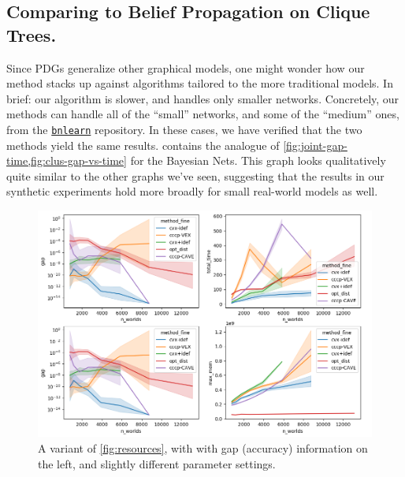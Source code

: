 \subsection{Comparing to Belief Propagation on Clique Trees.}
    \label{sec:bn-expt-details}
 Since PDGs generalize other graphical models, one might wonder how
 our method stacks up against algorithms tailored to the more
  traditional models. In brief: our algorithm is slower, and 
 handles only smaller networks.  
 Concretely, our methods can handle all of the ``small'' networks, and some of the ``medium'' ones, from the \href{https://www.bnlearn.com/bnrepository/}{\texttt{bnlearn}} repository. 
  In these cases, we have verified that the two methods yield the same results.
   contains the analogue of \cref{fig:joint-gap-time,fig:clus-gap-vs-time}
  for the Bayesian Nets. This graph looks qualitatively quite similar to the other graphs we've seen, suggesting that the results in our synthetic experiments hold more broadly for small real-world models as well.
  

  

 \begin{figure}
     \includegraphics[height=0.45\textheight]{figs/1}
     \caption{
         A variant of \cref{fig:resources}, with 
         with gap (accuracy) information on the left, and slightly different parameter settings. 
     }\label{fig:gap-resource-fine-old}
 \end{figure}


